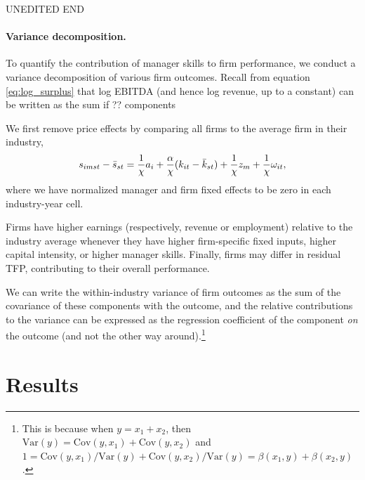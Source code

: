 \documentclass[11pt,a4paper]{article}
\newcommand{\Var}{\text{Var}}
\newcommand{\Cov}{\text{Cov}}
\begin{document}
UNEDITED END

\paragraph{Variance decomposition.} To quantify the contribution of manager skills to firm performance, we conduct a variance decomposition of various firm outcomes. Recall from equation \eqref{eq:log_surplus} that log EBITDA (and hence log revenue, up to a constant) can be written as the sum if ?? components

We first remove price effects by comparing all firms to the average firm in their industry,
\begin{equation}
s_{imst} - \Bar s_{st} = \frac1\chi a_i + \frac\alpha\chi (k_{it} - \Bar k_{st}) + \frac1\chi {z}_{m}+ \frac1\chi{\omega}_{it},
\end{equation}
where we have normalized manager and firm fixed effects to be zero in each industry-year cell.

Firms have higher earnings (respectively, revenue or employment) relative to the industry average whenever they have higher firm-specific fixed inputs, higher capital intensity, or higher manager skills. Finally, firms may differ in residual TFP, contributing to their overall performance.

We can write the within-industry variance of firm outcomes as the sum of the covariance of these components with the outcome, and the relative contributions to the variance can be expressed as the regression coefficient of the component \emph{on} the outcome (and not the other way around).\footnote{This is because when $y = x_1 + x_2$, then $\Var(y) = \Cov(y, x_1) + \Cov(y, x_2)$ and $1 = \Cov(y, x_1) / \Var(y) + \Cov(y, x_2) / \Var(y) = \beta(x_1, y) + \beta(x_2, y)$.}

\section{Results}
\end{document}
